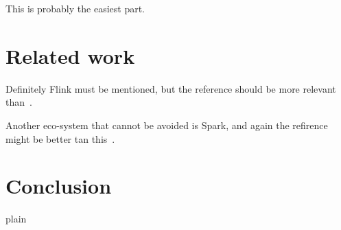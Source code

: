 \documentclass {article}
\begin{document}
This is probably the easiest part.

\section {Related work}

Definitely Flink must be mentioned, but the reference should be more relevant than~\cite{Horvath:2017:CGS:3098572.3098579}.

Another eco-system that cannot be avoided is Spark, and again the refirence might be better tan this~\cite{Chen:2016:DRE:3006299.3006326}.


\section {Conclusion}

 {plain}

\end{document}
